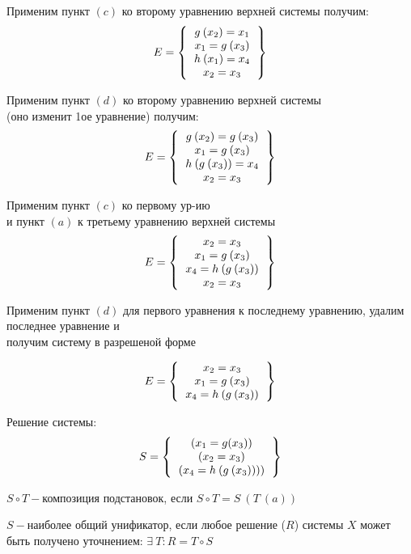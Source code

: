			Применим пункт $(c)$ ко второму уравнению верхней системы получим:
			\[
		E=
			\left \{
			\begin{tabular}{c}
				$g\:(x_2)=x_1$\\
				$x_1=g\:(x_3)$\\
				$h\:(x_1)=x_4$\\
				$x_2=x_3$
			\end{tabular}
			\right \}
		\]

			Применим пункт $(d)$ ко второму уравнению верхней системы\\
				(оно изменит 1ое уравнение) получим:
			\[
			E=
			\left \{
			\begin{tabular}{c}
				$g\:(x_2)=g\:(x_3)$\\
				$x_1=g\:(x_3)$\\
				$h\:(g\:(x_3))=x_4$\\
				$x_2=x_3$

			\end{tabular}
			\right \}
		\]

			Применим пункт $(c)$ ко первому ур-ию\\
				и пункт $(a)$ к третьему уравнению верхней системы
			\[
			E=
			\left \{
			\begin{tabular}{c}
				$x_2=x_3$\\
				$x_1=g\:(x_3)$\\
				$x_4=h\:(g\:(x_3))$\\
				$x_2=x_3$
			\end{tabular}
			\right \}
		\]

			Применим пункт $(d)$ для первого уравнения к последнему уравнению, удалим последнее уравнение и \\
			получим систему в разрешеной форме

\[
			E=
			\left \{
			\begin{tabular}{c}
				$x_2=x_3$\\
				$x_1=g\:(x_3)$\\
				$x_4=h\:(g\:(x_3))$
			\end{tabular}
			\right \}
		\]

			Решение системы:
		\[		S=
			\left \{
			\begin{tabular}{c}
				$(x_1=g(x_3))$\\
				$(x_2=x_3)$\\
				$(x_4=h\:(g\:(x_3))))$\\
			\end{tabular}
			\right \}
		\]

	\begin{definition} $S \circ T-$композиция подстановок, если $S \circ T=S\:(T\:(a))$\end{definition}
	\begin{definition} $S-$наиболее общий унификатор, если любое решение ($R$) системы $X$ может быть получено уточнением: $\exists\:T:R=T\circ S$\end{definition}

